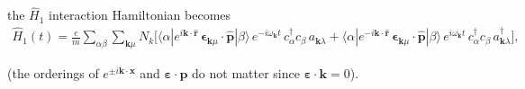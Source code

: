 \documentclass[letterpaper,10pt,english]{jupyterBook}
\begin{document}
\sphinxAtStartPar
the \(\hat{H}_1\) interaction Hamiltonian becomes
\begin{equation}\label{equation:ch/quantum-mechanics/qft/interactions-e-em-fields-atom-spectrum:eq:atom-spectra:H1}
\begin{split}
\hat{H}_1(t)=\frac em\sum_{\alpha\beta}\sum_{\mathbf k \mu}N_k\Big[\langle\alpha|e^{i\mathbf k\cdot\hat{\mathbf{r}}}\,\boldsymbol\epsilon_{\mathbf{k} \mu}\!\cdot\!\hat{\mathbf{p}}|\beta\rangle\, e^{-i \omega_{\mathbf{k}} t}\,c_\alpha^\dagger c_\beta\,a_{\mathbf k\lambda} +\langle\alpha|e^{-i\mathbf k\cdot\hat{\mathbf{r}}}\,\boldsymbol\epsilon_{\mathbf{k}\mu}\!\cdot\!\hat{\mathbf{p}}|\beta\rangle\, e^{i \omega_{\mathbf{k}} t}\,c_\alpha^\dagger c_\beta\,a^\dagger_{\mathbf k\lambda}\Big],
\end{split}
\end{equation}


\sphinxAtStartPar
(the orderings of \(e^{\pm i\mathbf k\cdot\mathbf x}\) and \(\boldsymbol\varepsilon\!\cdot\!\mathbf p\) do not matter since \(\boldsymbol\varepsilon\!\cdot\!\mathbf k=0\)).
\end{document}
